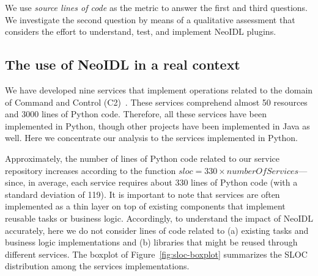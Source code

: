 \documentclass{ws-ijseke}
\newcommand{\neoidl}{NeoIDL}
\begin{document}
We use \emph{source lines of code} as the metric to answer the first
and third questions. We investigate the second question by means of a 
qualitative assessment that considers the effort to understand, test,
and implement \neoidl{} plugins.
 
\subsection{The use of \neoidl{} in a real context}\label{sub:experience}

We have developed nine services that implement operations related to 
the domain of Command and Control (C2)~\cite{david:commandControl}. 
These services comprehend almost 50 resources and 
3000 lines of Python code. Therefore, all these services have been
implemented in Python, though other projects have been implemented in
Java as well. Here we concentrate our analysis to the services implemented
in Python. 

Approximately, the number of lines of Python code related to 
our service repository increases according to the 
function $sloc = 330 \times numberOfServices$--- since, in average, each
service requires about 330 lines of Python code (with a standard
deviation of 119). It is important to note that services are often
implemented as a thin layer on top of existing components that
implement reusable tasks or business logic. Accordingly, to understand
the impact of \neoidl{} accurately, here we do not consider lines of code related to (a) existing tasks and 
business logic implementations and (b) libraries that might be 
reused through different services. 
The boxplot of Figure~\ref{fig:sloc-boxplot}
summarizes the SLOC distribution among the services 
implementations. 
\end{document}
